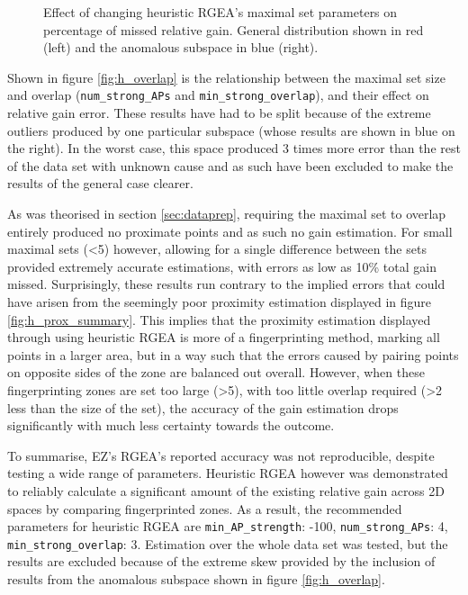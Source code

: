 \documentclass{UoYCSproject}
\begin{document}
\begin{figure}[h]
\begin{minipage}{0.5\textwidth}
                    \end{minipage}
                    \caption{Effect of changing heuristic RGEA's maximal set parameters on percentage of missed relative gain. General distribution shown in red (left) and the anomalous subspace in blue (right).}
                \end{figure}
                
                Shown in figure \ref{fig:h_overlap} is the relationship between the maximal set size and overlap (\texttt{num\_strong\_APs} and \texttt{min\_strong\_overlap}), and their effect on relative gain error. These results have had to be split because of the extreme outliers produced by one particular subspace (whose results are shown in blue on the right). In the worst case, this space produced 3 times more error than the rest of the data set with unknown cause and as such have been excluded to make the results of the general case clearer.
                
                As was theorised in section \ref{sec:dataprep}, requiring the maximal set to overlap entirely produced no proximate points and as such no gain estimation. For small maximal sets (<5) however, allowing for a single difference between the sets provided extremely accurate estimations, with errors as low as 10\% total gain missed. Surprisingly, these results run contrary to the implied errors that could have arisen from the seemingly poor proximity estimation displayed in figure \ref{fig:h_prox_summary}. This implies that the proximity estimation displayed through using heuristic RGEA is more of a fingerprinting method, marking all points in a larger area, but in a way such that the errors caused by pairing points on opposite sides of the zone are balanced out overall. However, when these fingerprinting zones are set too large (>5), with too little overlap required (>2 less than the size of the set), the accuracy of the gain estimation drops significantly with much less certainty towards the outcome. 
                
                To summarise, EZ's RGEA's reported accuracy was not reproducible, despite testing a wide range of parameters. Heuristic RGEA however was demonstrated to reliably calculate a significant amount of the existing relative gain across 2D spaces by comparing fingerprinted zones. As a result, the recommended parameters for heuristic RGEA are \texttt{min\_AP\_strength}: -100, \texttt{num\_strong\_APs}: 4, \texttt{min\_strong\_overlap}: 3. Estimation over the whole data set was tested, but the results are excluded because of the extreme skew provided by the inclusion of results from the anomalous subspace shown in figure \ref{fig:h_overlap}.
	    
\end{document}
